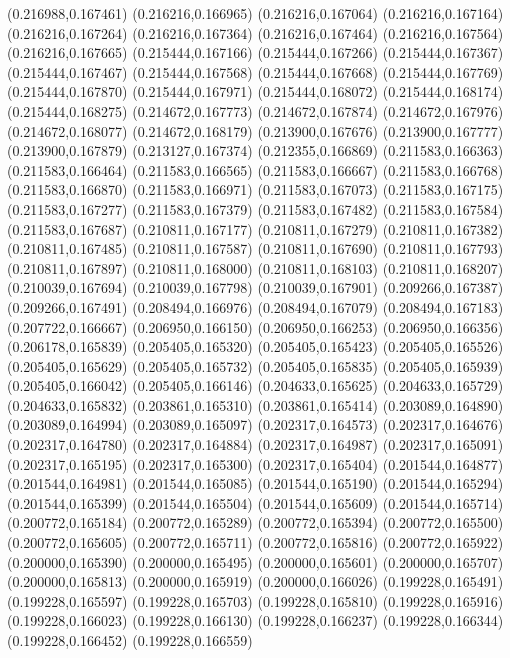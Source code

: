 (0.216988,0.167461)
(0.216216,0.166965)
(0.216216,0.167064)
(0.216216,0.167164)
(0.216216,0.167264)
(0.216216,0.167364)
(0.216216,0.167464)
(0.216216,0.167564)
(0.216216,0.167665)
(0.215444,0.167166)
(0.215444,0.167266)
(0.215444,0.167367)
(0.215444,0.167467)
(0.215444,0.167568)
(0.215444,0.167668)
(0.215444,0.167769)
(0.215444,0.167870)
(0.215444,0.167971)
(0.215444,0.168072)
(0.215444,0.168174)
(0.215444,0.168275)
(0.214672,0.167773)
(0.214672,0.167874)
(0.214672,0.167976)
(0.214672,0.168077)
(0.214672,0.168179)
(0.213900,0.167676)
(0.213900,0.167777)
(0.213900,0.167879)
(0.213127,0.167374)
(0.212355,0.166869)
(0.211583,0.166363)
(0.211583,0.166464)
(0.211583,0.166565)
(0.211583,0.166667)
(0.211583,0.166768)
(0.211583,0.166870)
(0.211583,0.166971)
(0.211583,0.167073)
(0.211583,0.167175)
(0.211583,0.167277)
(0.211583,0.167379)
(0.211583,0.167482)
(0.211583,0.167584)
(0.211583,0.167687)
(0.210811,0.167177)
(0.210811,0.167279)
(0.210811,0.167382)
(0.210811,0.167485)
(0.210811,0.167587)
(0.210811,0.167690)
(0.210811,0.167793)
(0.210811,0.167897)
(0.210811,0.168000)
(0.210811,0.168103)
(0.210811,0.168207)
(0.210039,0.167694)
(0.210039,0.167798)
(0.210039,0.167901)
(0.209266,0.167387)
(0.209266,0.167491)
(0.208494,0.166976)
(0.208494,0.167079)
(0.208494,0.167183)
(0.207722,0.166667)
(0.206950,0.166150)
(0.206950,0.166253)
(0.206950,0.166356)
(0.206178,0.165839)
(0.205405,0.165320)
(0.205405,0.165423)
(0.205405,0.165526)
(0.205405,0.165629)
(0.205405,0.165732)
(0.205405,0.165835)
(0.205405,0.165939)
(0.205405,0.166042)
(0.205405,0.166146)
(0.204633,0.165625)
(0.204633,0.165729)
(0.204633,0.165832)
(0.203861,0.165310)
(0.203861,0.165414)
(0.203089,0.164890)
(0.203089,0.164994)
(0.203089,0.165097)
(0.202317,0.164573)
(0.202317,0.164676)
(0.202317,0.164780)
(0.202317,0.164884)
(0.202317,0.164987)
(0.202317,0.165091)
(0.202317,0.165195)
(0.202317,0.165300)
(0.202317,0.165404)
(0.201544,0.164877)
(0.201544,0.164981)
(0.201544,0.165085)
(0.201544,0.165190)
(0.201544,0.165294)
(0.201544,0.165399)
(0.201544,0.165504)
(0.201544,0.165609)
(0.201544,0.165714)
(0.200772,0.165184)
(0.200772,0.165289)
(0.200772,0.165394)
(0.200772,0.165500)
(0.200772,0.165605)
(0.200772,0.165711)
(0.200772,0.165816)
(0.200772,0.165922)
(0.200000,0.165390)
(0.200000,0.165495)
(0.200000,0.165601)
(0.200000,0.165707)
(0.200000,0.165813)
(0.200000,0.165919)
(0.200000,0.166026)
(0.199228,0.165491)
(0.199228,0.165597)
(0.199228,0.165703)
(0.199228,0.165810)
(0.199228,0.165916)
(0.199228,0.166023)
(0.199228,0.166130)
(0.199228,0.166237)
(0.199228,0.166344)
(0.199228,0.166452)
(0.199228,0.166559)
